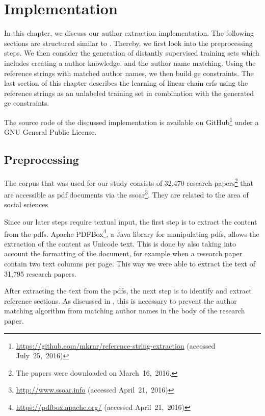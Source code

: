 \chapter{Implementation}\label{cha:implementation}

In this chapter, we discuss our author extraction implementation.
The following sections are structured similar to .
Thereby, we first look into the preprocessing steps.
We then consider the generation of distantly supervised training sets which includes creating a author knowledge, and the author name matching.
Using the reference strings with matched author names, we then build \gls{ge} constraints.
The last section of this chapter describes the learning of \glspl{linear-chain crf} using the reference strings as an unlabeled training set in combination with the generated \gls{ge} constraints.

The source code of the discussed implementation is available on GitHub\footnote{\url{https://github.com/mkrnr/reference-string-extraction} (accessed July~25,~2016)} under a GNU General Public License.

\section{Preprocessing}\label{sec:i-preprocessing}

The corpus that was used for our study consists of \num{32,470} research papers\footnote{The papers were downloaded on March~16,~2016.} that are accessible as \gls{pdf} documents via the \gls{ssoar}\footnote{\url{http://www.ssoar.info} (accessed April~21,~2016)}.
They are related to the area of social sciences

Since our later steps require textual input, the first step is to extract the content from the \glspl{pdf}.
Apache PDFBox\footnote{\url{https://pdfbox.apache.org/} (accessed April~21,~2016)}, a Java library for manipulating \glspl{pdf}, allows the extraction of the content as Unicode text.
This is done by also taking into account the formatting of the document, for example when a research paper contain two text columns per page.
This way we were able to extract the text of 31,795 research papers.

\bigskip

After extracting the text from the \glspl{pdf}, the next step is to identify and extract reference sections.
As discussed in , this is necessary to prevent the author matching algorithm from matching author names in the body of the research paper.


